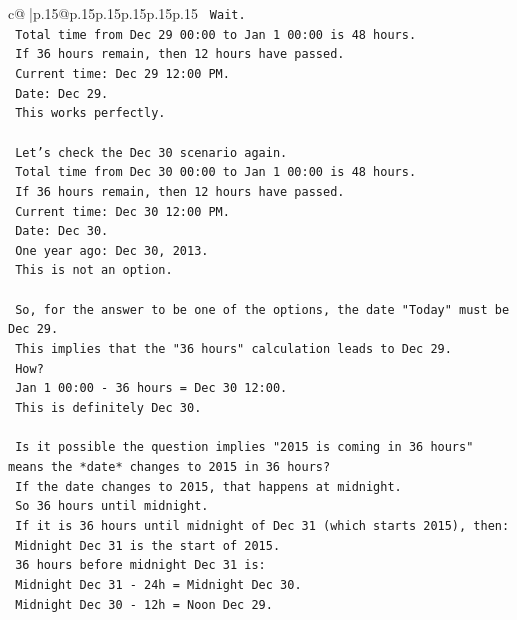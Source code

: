 \documentclass{article}
\begin{document}
{\begin{supertabular}{c@{$\;$}|p{.15\linewidth}@{}p{.15\linewidth}p{.15\linewidth}p{.15\linewidth}p{.15\linewidth}p{.15\linewidth}}
{{{\texttt{    Wait.} \\
\texttt{    Total time from Dec 29 00:00 to Jan 1 00:00 is 48 hours.} \\
\texttt{    If 36 hours remain, then 12 hours have passed.} \\
\texttt{    Current time: Dec 29 12:00 PM.} \\
\texttt{    Date: Dec 29.} \\
\texttt{    This works perfectly.} \\
\\ 
\texttt{    Let's check the Dec 30 scenario again.} \\
\texttt{    Total time from Dec 30 00:00 to Jan 1 00:00 is 48 hours.} \\
\texttt{    If 36 hours remain, then 12 hours have passed.} \\
\texttt{    Current time: Dec 30 12:00 PM.} \\
\texttt{    Date: Dec 30.} \\
\texttt{    One year ago: Dec 30, 2013.} \\
\texttt{    This is not an option.} \\
\\ 
\texttt{    So, for the answer to be one of the options, the date "Today" must be Dec 29.} \\
\texttt{    This implies that the "36 hours" calculation leads to Dec 29.} \\
\texttt{    How?} \\
\texttt{    Jan 1 00:00 {-} 36 hours = Dec 30 12:00.} \\
\texttt{    This is definitely Dec 30.} \\
\\ 
\texttt{    Is it possible the question implies "2015 is coming in 36 hours" means the *date* changes to 2015 in 36 hours?} \\
\texttt{    If the date changes to 2015, that happens at midnight.} \\
\texttt{    So 36 hours until midnight.} \\
\texttt{    If it is 36 hours until midnight of Dec 31 (which starts 2015), then:} \\
\texttt{    Midnight Dec 31 is the start of 2015.} \\
\texttt{    36 hours before midnight Dec 31 is:} \\
\texttt{    Midnight Dec 31 {-} 24h = Midnight Dec 30.} \\
\texttt{    Midnight Dec 30 {-} 12h = Noon Dec 29.} \\
}}}
\end{supertabular}}
\end{document}
